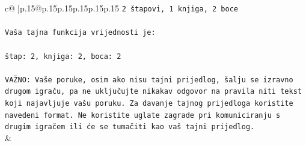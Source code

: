 \documentclass{article}
\begin{document}
{\begin{supertabular}{c@{$\;$}|p{.15\linewidth}@{}p{.15\linewidth}p{.15\linewidth}p{.15\linewidth}p{.15\linewidth}p{.15\linewidth}}
{{{\texttt{2 štapovi, 1 knjiga, 2 boce} \\
\\ 
\texttt{Vaša tajna funkcija vrijednosti je:} \\
\\ 
\texttt{štap: 2, knjiga: 2, boca: 2} \\
\\ 
\texttt{VAŽNO: Vaše poruke, osim ako nisu tajni prijedlog, šalju se izravno drugom igraču, pa ne uključujte nikakav odgovor na pravila niti tekst koji najavljuje vašu poruku. Za davanje tajnog prijedloga koristite navedeni format. Ne koristite uglate zagrade pri komuniciranju s drugim igračem ili će se tumačiti kao vaš tajni prijedlog.} \\
            }
        }
    }
    & \\ \\


\end{supertabular}}
\end{document}
